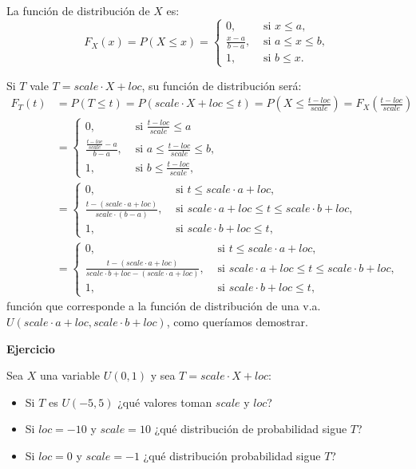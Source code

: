 \documentclass[]{book}
\begin{document}
La función de distribución de \(X\) es:
\[
F_X(x)=P(X\leq x)=\left\{\begin{array}{ll} 0, & \mbox{ si } x\leq a,\\\frac{x-a}{b-a}, & \mbox{ si } a\leq x\leq b, \\1, & \mbox{ si } b\leq x.\end{array}\right.
\]

Si \(T\) vale \(T=scale\cdot X+loc\), su función de distribución será:
\[
\begin{array}{rl}
F_T(t)&=P(T\leq t)= P(scale\cdot X+ loc\leq t)= P\left(X\leq \frac{t-loc}{scale}\right)=F_X\left(\frac{t-loc}{scale}\right)\\
&=
\left\{\begin{array}{ll} 0, & \mbox{ si } \frac{t-loc}{scale}\leq a\\\frac{\frac{t-loc}{scale}-a}{b-a}, & \mbox{ si } a\leq \frac{t-loc}{scale}\leq b,\\1, & \mbox{ si } b\leq \frac{t-loc}{scale},\end{array}\right. \\ & =
\left\{\begin{array}{ll} 0, & \mbox{ si }  t\leq scale\cdot a +loc, \\
\frac{t-(scale\cdot a+loc)}{scale\cdot (b-a)}, & \mbox{ si } scale\cdot a+loc \leq t\leq scale\cdot b+loc, \\
1, & \mbox{ si } scale\cdot b+loc\leq t, \end{array}\right.\\
& = 
\left\{\begin{array}{ll} 0, & \mbox{ si }  t\leq scale\cdot a +loc, \\
\frac{t-(scale\cdot a+loc)}{scale\cdot b+loc-(scale\cdot a+loc)}, & \mbox{ si } scale\cdot a+loc \leq t\leq scale\cdot b+loc, \\
1, & \mbox{ si } scale\cdot b+loc\leq t,\end{array}\right.
\end{array}
\]
función que corresponde a la función de distribución de una v.a. \(U(scale\cdot a+loc,scale\cdot b+loc)\), como queríamos demostrar.

\textbf{Ejercicio}

Sea \(X\) una variable \(U(0,1)\) y sea \(T=scale\cdot X+loc\):

\begin{itemize}
\item
  Si \(T\) es \(U(-5,5)\) ¿qué valores toman \(scale\) y \(loc\)?
\item
  Si \(loc=-10\) y \(scale=10\) ¿qué distribución de probabilidad sigue \(T\)?
\item
  Si \(loc=0\) y \(scale=-1\) ¿qué distribución probabilidad sigue \(T\)?
\end{itemize}
\end{document}
